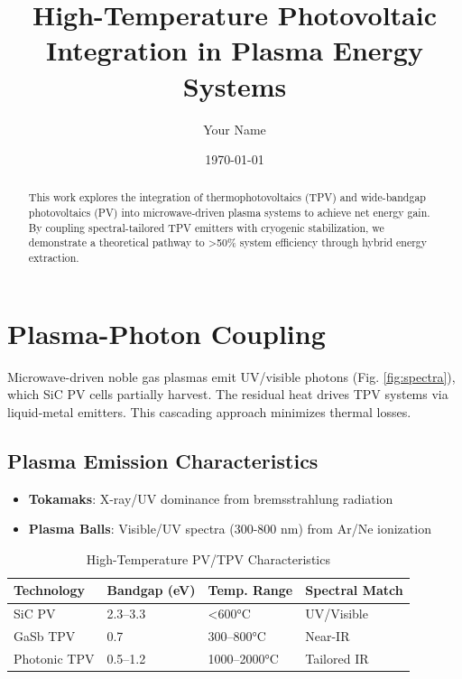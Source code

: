 \documentclass{article}
\title{High-Temperature Photovoltaic Integration in Plasma Energy Systems}
\author{Your Name}
\date{\today}
\begin{document}
\maketitle

\begin{abstract}
This work explores the integration of thermophotovoltaics (TPV) and wide-bandgap photovoltaics (PV) into microwave-driven plasma systems to achieve net energy gain. By coupling spectral-tailored TPV emitters with cryogenic stabilization, we demonstrate a theoretical pathway to >50\% system efficiency through hybrid energy extraction.
\end{abstract}

\section{Plasma-Photon Coupling}
\label{sec:coupling}
Microwave-driven noble gas plasmas emit UV/visible photons (Fig. \ref{fig:spectra}), which SiC PV cells partially harvest. The residual heat drives TPV systems via liquid-metal emitters. This cascading approach minimizes thermal losses.

\subsection{Plasma Emission Characteristics}
\begin{itemize}
    \item \textbf{Tokamaks}: X-ray/UV dominance from bremsstrahlung radiation
    \item \textbf{Plasma Balls}: Visible/UV spectra (300-800 nm) from Ar/Ne ionization
\end{itemize}

\begin{table}[ht]
    \centering
    \caption{High-Temperature PV/TPV Characteristics}
    \label{tab:pv_tpv}
    \begin{tabular}{llll}
        \toprule
        \textbf{Technology} & \textbf{Bandgap (eV)} & \textbf{Temp. Range} & \textbf{Spectral Match} \\
        \midrule
        SiC PV & 2.3–3.3 & <600°C & UV/Visible \\
        GaSb TPV & 0.7 & 300–800°C & Near-IR \\
        Photonic TPV & 0.5–1.2 & 1000–2000°C & Tailored IR \\
        \bottomrule
    \end{tabular}
\end{table}
\end{document}
